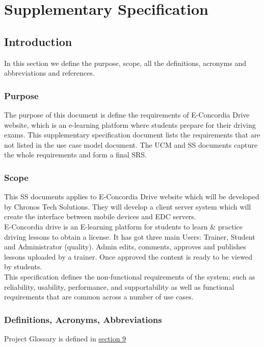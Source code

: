 \documentclass{report}
\begin{document}
\chapter{Supplementary Specification}
\section{ Introduction}
In this section we define the purpose, scope, all the definitions, acronyms and abbreviations and references.
\subsection{ Purpose}
The purpose of this document is define the requirements of E-Concordia Drive website, which is an e-learning platform where students prepare for their driving exams. This supplementary specification document lists the requirements that are not listed in the use case model document. The UCM and SS documents capture the whole requirements and form a final SRS.
\subsection{ Scope}
This SS documents applies to E-Concordia Drive website which will be developed by Chronos Tech Solutions. They will develop a client server system which will create the interface between mobile devices and EDC servers.\\[0.2cm]

E-Concordia drive is an E-learning platform for students to learn \& practice driving lessons to obtain a license. It has got three main Users: Trainer, Student and Administrator (quality). Admin edits, comments, approves and publishes  lessons uploaded by a trainer.  Once approved the content is ready to be viewed by students.\\[0.2cm]
This specification defines the non-functional requirements of the system; such as reliability, usability, performance, and supportability as well as functional requirements that are common across a number of use cases.
\subsection{ Definitions, Acronyms, Abbreviations}
Project Glossary is defined in \hyperref[sec:Glossary]{section 9}
\end{document}
